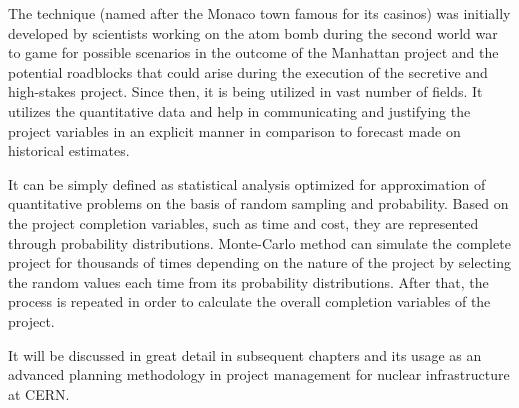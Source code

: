 The technique (named after the Monaco town famous for its casinos) was initially developed by scientists working on the atom bomb during the second world war to game for possible scenarios in the outcome of the Manhattan project and the potential roadblocks that could arise during the execution of the secretive and high-stakes project. Since then, it is being utilized in vast number of fields. It utilizes the quantitative data and help in communicating and justifying the project variables in an explicit manner in comparison to forecast made on historical estimates.

It can be simply defined as statistical analysis optimized for approximation of quantitative problems on the basis of random sampling and probability. Based on the project completion variables, such as time and cost, they are represented through probability distributions. Monte-Carlo method can simulate the complete project for thousands of times depending on the nature of the project by selecting the random values each time from its probability distributions. After that, the process is repeated in order to calculate the overall completion variables of the project.

It will be discussed in great detail in subsequent chapters and its usage as an advanced planning methodology in project management for nuclear infrastructure at CERN.

